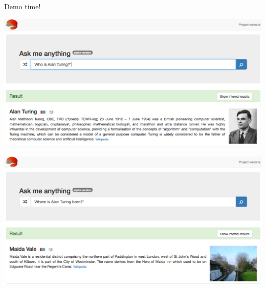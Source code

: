 \begin{frame}
\begin{columns}
\begin{column}{0.5\textwidth}
    \end{column}
    \end{columns}
\end{frame}

\begin{frame}
    \begin{center}
        \Huge Demo time!
    \end{center}
\end{frame}

\begin{frame}[plain]
    \includegraphics[width=\linewidth]{figures/demo-whoIsAlanTuring.png}
\end{frame}

\begin{frame}[plain]
    \includegraphics[width=\linewidth]{figures/demo-whenIsAlanTuringBorn.png}
\end{frame}

